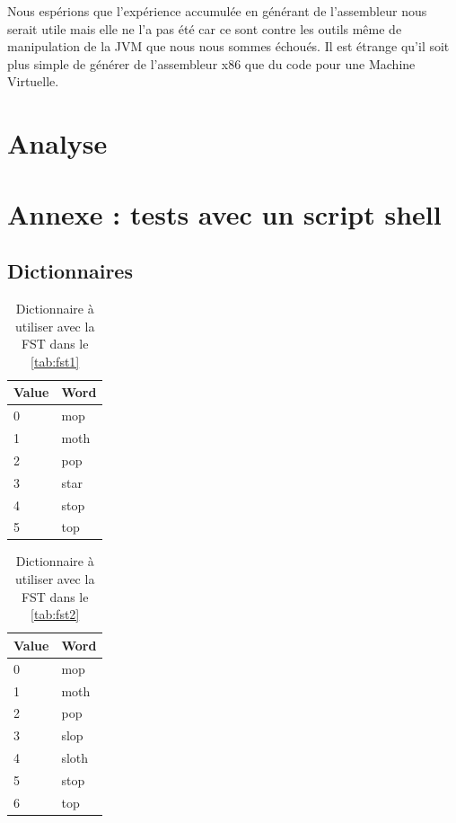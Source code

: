 Nous espérions que l'expérience accumulée en générant de l'assembleur nous serait utile mais
elle ne l'a pas été car ce sont contre les outils même de manipulation de la JVM que nous
nous sommes échoués. Il est étrange qu'il soit plus simple de générer de l'assembleur
x86 que du code pour une Machine Virtuelle.

\newpage
\section{Analyse}

\newpage
\appendix
\section{Annexe : tests avec un script shell}
\label{sec:annexe:shell}

\subsection{Dictionnaires}

\begin{table}[h]
    \centering
    \begin{tabular}{|l|l|}
        \hline
        Value & Word \\
        \hline
        0 & mop \\
        1 & moth \\
        2 & pop \\
        3 & star \\
        4 & stop \\
        5 & top \\
        \hline
    \end{tabular}
    \caption{Dictionnaire à utiliser avec la FST dans le \autoref{tab:fst1}}
    \label{tab:dico1}
\end{table}

\begin{table}[h]
    \centering
    \begin{tabular}{|l|l|}
        \hline
        Value & Word \\
        \hline
        0 & mop \\
        1 & moth \\
        2 & pop \\
        3 & slop \\
        4 & sloth \\
        5 & stop \\
        6 & top \\
        \hline
    \end{tabular}
    \caption{Dictionnaire à utiliser avec la FST dans le \autoref{tab:fst2}}
    \label{tab:dico2}
\end{table}

